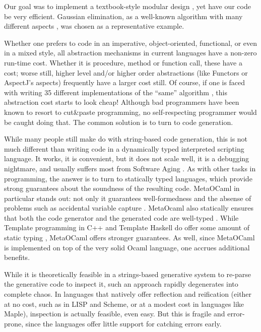 \documentclass{llncs}
\newcommand{\oleg}[1]{{\it [Oleg says: #1]}}
\begin{document}
Our goal was to implement a textbook-style modular design 
\cite{journals/cacm/parnas72a}, yet 
have our code be very efficient.  Gaussian elimination, as a  
well-known algorithm with many different aspects 
\cite{carette04}, was chosen as a representative example.

Whether one prefers to code in an imperative, object-oriented, functional, 
or even in a mixed style, all abstraction mechanisms in current
languages have a non-zero run-time cost.  Whether it is procedure,
method or function call, these have a cost; worse still, higher level
and/or higher order abstractions (like Functors or AspectJ's aspects)
frequently have a larger cost still.  Of course, if one is faced with
writing 35 different implementations of the ``same'' algorithm
\cite{carette04}, this
abstraction cost starts to look cheap!  Although bad programmers have
been known to resort to cut\&paste programming, no self-respecting
programmer would be caught doing that.
The common solution is to turn to code generation.

While many people still make do with string-based code generation,
this is not much different than writing code in a dynamically typed
interpreted scripting language.  It works, it is convenient, but it
does not scale well, it is a debugging nightmare, and usually suffers
most from Software Aging \cite{parnas_aging}.  As with other tasks in
programming, the answer is to turn to statically typed languages,
which provide strong guarantees about the soundness of the resulting
code.  MetaOCaml \cite{CTHL03,metaocaml-org} in particular stands
out: not only it guarantees well-formedness and the absense of problems 
such as accidental variable capture \cite{HygienicMacros}. MetaOcaml also
statically ensures that both the code generator and the generated code
are well-typed \cite{TahaSheard97,TahaThesis}.  While Template
programming in C++ and Template Haskell do offer some amount of static
typing \cite{conf/dagstuhl/CzarneckiOST03}, MetaOCaml
offers stronger guarantees.  As well, since MetaOCaml is
implemented on top of the very solid Ocaml language, one accrues
additional benefits.

While it is theoretically feasible in a strings-based
generative system to re-parse the generative code to inspect it, such
an approach rapidly degenerates into complete chaos.
In languages
that natively offer reflection and reification (either at no cost, 
such as in LISP and Scheme, or at a modest cost in languages like 
Maple), inspection is actually feasible, even easy.  But this is fragile
and error-prone, since the languages offer little support for catching
errors early.
\end{document}

